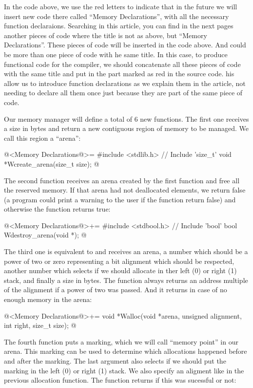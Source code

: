 In the code above, we use the red letters to indicate that in the
future we will insert new code there called ``Memory Declarations'',
with all the necessary function declaraions. Searching in this
article, you can find in the next pages another pieces of code where
the title is not  as above, but ``Memory
Declarations''. These pieces of code will be inserted in the code
above. And could be more than one piece of code with he same title. In
this case, to produce functional code for the compiler, we should
concatenate all these pieces of code with the same title and put in
the part marked as red in the source code. his allow us to introduce
function declarations as we explain them in the article, not needing
to declare all them once just because they are part of the same piece
of code.


Our memory manager will define a total of 6 new functions. The first
one receives a size in bytes and return a new contiguous region of
memory to be managed. We call this region a ``arena'':

\iniciocodigo
@<Memory Declarations@>=
#include <stdlib.h> // Include 'size_t'
void *Wcreate_arena(size_t size);
@
\fimcodigo

The second function receives an arena created by the first function
and free all the reserved memory. If that arena had not deallocated
elements, we return false (a program could print a warning to the user
if the function return false) and otherwise the function returns true:

\iniciocodigo
@<Memory Declarations@>+=
#include <stdbool.h> // Include 'bool'
bool Wdestroy_arena(void *);
@
\fimcodigo

The third one is equivalent to  and receives an
arena, a number which should be a power of two or zero representing a
bit alignment which should be respected, another number which selects
if we should allocate in ther left (0) or right (1) stack, and finally
a size in bytes. The function always returns an address multiple of
the alignment if a power of two was passed. And it
returns  in case of no enough memory in the arena:

\iniciocodigo
@<Memory Declarations@>+=
void *Walloc(void *arena, unsigned alignment, int right, size_t size);
@
\fimcodigo

The fourth function puts a marking, which we will call ``memory
point'' in our arena. This marking can be used to determine which
allocations happened before and after the marking. The last argument
also selects if we should put the marking in the left (0) or right (1)
stack. We also specify an aligment like in the previous allocation
function. The function returns if this was sucessful or not:

